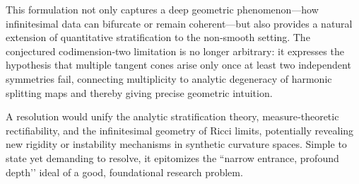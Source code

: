This formulation not only captures a deep geometric phenomenon—how infinitesimal data can bifurcate or remain coherent—but also provides a natural extension of quantitative stratification to the non‑smooth setting. The conjectured codimension‑two limitation is no longer arbitrary: it expresses the hypothesis that multiple tangent cones arise only once at least two independent symmetries fail, connecting multiplicity to analytic degeneracy of harmonic splitting maps and thereby giving precise geometric intuition.  

A resolution would unify the analytic stratification theory, measure‑theoretic rectifiability, and the infinitesimal geometry of Ricci limits, potentially revealing new rigidity or instability mechanisms in synthetic curvature spaces. Simple to state yet demanding to resolve, it epitomizes the “narrow entrance, profound depth’’ ideal of a good, foundational research problem.